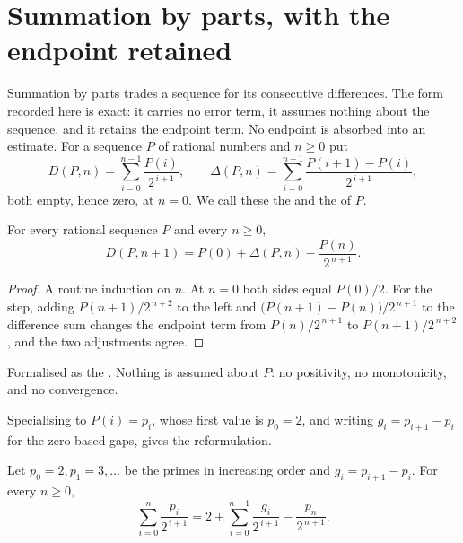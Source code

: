 \section{Summation by parts, with the endpoint retained}\label{long251:sec:parts}

Summation by parts trades a sequence for its consecutive differences.  The form
recorded here is exact: it carries no error term, it assumes nothing about the
sequence, and it retains the endpoint term.  No endpoint is absorbed into an
estimate.  For a sequence $P$ of rational numbers and $n\ge0$ put
\[
 D(P,n)=\sum_{i=0}^{n-1}\frac{P(i)}{2^{\,i+1}},
 \qquad
 \Delta(P,n)=\sum_{i=0}^{n-1}\frac{P(i+1)-P(i)}{2^{\,i+1}} ,
\]
both empty, hence zero, at $n=0$.  We call these the
 and the
 of $P$.

\begin{proposition}\label{long251:res:abel}
For every rational sequence $P$ and every $n\ge0$,
\[
 D(P,n+1)=P(0)+\Delta(P,n)-\frac{P(n)}{2^{\,n+1}} .
\]
\end{proposition}

\begin{proof}
A routine induction on $n$.  At $n=0$ both sides equal $P(0)/2$.  For the step,
adding $P(n+1)/2^{\,n+2}$ to the left and $\bigl(P(n+1)-P(n)\bigr)/2^{\,n+1}$
to the difference sum changes the endpoint term from $P(n)/2^{\,n+1}$ to
$P(n+1)/2^{\,n+2}$, and the two adjustments agree.
\end{proof}

\noindent Formalised as the
.  Nothing is assumed about $P$: no positivity, no monotonicity, and
no convergence.

Specialising to $P(i)=p_i$, whose first value is $p_0=2$, and writing
$g_i=p_{i+1}-p_i$ for the zero-based gaps, gives the reformulation.

\begin{theorem}\label{long251:res:parts}
Let $p_0=2,p_1=3,\ldots$ be the primes in increasing order and
$g_i=p_{i+1}-p_i$.  For every $n\ge0$,
\[
 \sum_{i=0}^{n}\frac{p_i}{2^{\,i+1}}
 =2+\sum_{i=0}^{n-1}\frac{g_i}{2^{\,i+1}}-\frac{p_n}{2^{\,n+1}} .
\]
\end{theorem}


